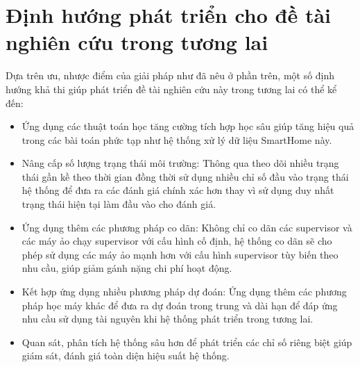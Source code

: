 \section{Định hướng phát triển cho đề tài nghiên cứu trong tương lai}

Dựa trên ưu, nhược điểm của giải pháp \tenKL như đã nêu ở phần trên, một số định hướng khả thi giúp phát triển đề tài nghiên cứu này trong tương lai có thể kể đến:

\begin{itemize}
    \item Ứng dụng các thuật toán học tăng cường tích hợp học sâu giúp tăng hiệu quả trong các bài toán phức tạp như hệ thống xử lý dữ liệu SmartHome này.
    \item Nâng cấp số lượng trạng thái môi trường: Thông qua theo dõi nhiều trạng thái gần kề theo thời gian đồng thời sử dụng nhiều chỉ số đầu vào trạng thái hệ thống để đưa ra các đánh giá chính xác hơn thay vì sử dụng duy nhất trạng thái hiện tại làm đầu vào cho đánh giá.
    \item Ứng dụng thêm các phương pháp co dãn: Không chỉ co dãn các supervisor và các máy ảo chạy supervisor với cấu hình cố định, hệ thống co dãn sẽ cho phép sử dụng các máy ảo mạnh hơn với cấu hình supervisor tùy biến theo nhu cầu, giúp giảm gánh nặng chi phí hoạt động.
    \item Kết hợp ứng dụng nhiều phương pháp dự đoán: Ứng dụng thêm các phương pháp học máy khác để đưa ra dự đoán trong trung và dài hạn để đáp ứng nhu cầu sử dụng tài nguyên khi hệ thống phát triển trong tương lai.
    \item Quan sát, phân tích hệ thống sâu hơn để phát triển các chỉ số riêng biệt giúp giám sát, đánh giá toàn diện hiệu suất hệ thống.
\end{itemize}